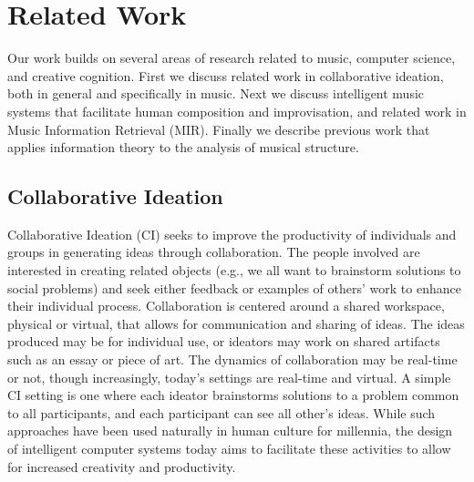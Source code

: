 \documentclass[final,authoryear,11pt,times]{elsarticle}
\begin{document}
\section{Related Work}

Our work builds on several areas of research related to music, computer science, and creative cognition. First we discuss related work in collaborative ideation, both in general and specifically in music. Next we discuss intelligent 
music systems that facilitate human composition and improvisation, and related work in Music Information Retrieval (MIR). Finally we describe previous work that applies information theory to the analysis of musical structure.

\subsection{Collaborative Ideation}

Collaborative Ideation (CI) seeks to improve the productivity of individuals and groups in generating ideas through collaboration. The people involved are interested in creating related objects (e.g., we all want to brainstorm solutions to social problems) and seek either feedback or examples of others' work to enhance their individual process. Collaboration is centered around a shared workspace, physical or virtual, that allows for communication and sharing of ideas. The ideas produced may be for individual use, or ideators may work on shared artifacts such as an essay or piece of art. The dynamics of collaboration may be real-time or not, though increasingly, today's settings are real-time and virtual. A simple CI setting is one where each ideator brainstorms solutions to a problem common to all participants, and each participant can see all other's ideas. While such approaches have been used naturally in human culture for millennia, the design of intelligent computer systems today aims to facilitate these activities to allow for increased creativity and productivity. 
\end{document}
